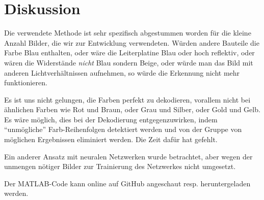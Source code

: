 \section{Diskussion}

Die verwendete Methode ist sehr spezifisch abgestummen worden f\"ur die kleine
Anzahl Bilder, die wir zur Entwicklung verwendeten. W\"urden  andere  Bauteile
die Farbe Blau  enthalten,  oder  w\"are  die  Leiterplatine  Blau  oder  hoch
reflektiv, oder w\"aren die Widerst\"ande  \textit{nicht}  Blau sondern Beige,
oder  w\"urde  man  das Bild mit anderen  Lichtverh\"altnissen  aufnehmen,  so
w\"urde die Erkennung nicht mehr funktionieren.

Es ist uns nicht gelungen, die  Farben  perfekt  zu dekodieren, vorallem nicht
bei \"ahnlichen Farben  wie Rot und Braun, oder Grau und Silber, oder Gold und
Gelb.  Es  w\"are  m\"oglich, dies bei der Dekodierung entgegenzuwirken, indem
``unm\"ogliche'' Farb-Reihenfolgen detektiert werden und  von  der  Gruppe von
m\"oglichen Ergebnissen eliminiert werden. Die Zeit daf\"ur hat gefehlt.

Ein anderer Ansatz mit neuralen Netzwerken wurde betrachtet,  aber  wegen  der
unmengen  n\"otiger  Bilder  zur  Trainierung  des Netzwerkes nicht umgesetzt.

Der  MATLAB-Code kann online auf GitHub\cite{ref:matlab-code} angeschaut resp.
heruntergeladen werden.
